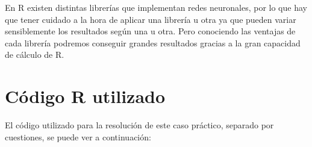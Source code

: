 \documentclass[12pt,a4paper,twoside,openright,titlepage,final]{article}
\begin{document}
En R existen distintas librerías que implementan redes neuronales, por lo que hay que tener cuidado a la hora de aplicar una librería u otra ya que pueden variar sensiblemente los resultados según una u otra. Pero conociendo las ventajas de cada librería podremos conseguir grandes resultados gracias a la gran capacidad de cálculo de R.

\clearpage

\section{Código R utilizado}

El código utilizado para la resolución de este caso práctico, separado por cuestiones, se puede ver a continuación:\\


 
\end{document}
